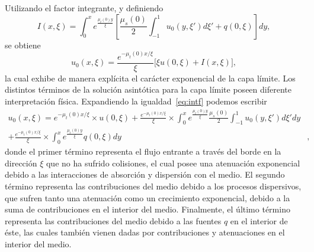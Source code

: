 Utilizando el factor integrante, y definiendo
\begin{equation*}
I(x,\xi) = \int_0^{x} e^{\frac{ \mu_t(0) y}{\xi}}\left[\frac{\mu_s(0)}{2} \int_{-1}^1u_0(y,\xi')d\xi'+q(0,\xi)\right]dy,
\end{equation*}
se obtiene
\begin{equation}
 u_0(x,\xi) = \frac{e^{-\mu_t(0)x/\xi}}{\xi} \Big[\xi u(0,\xi)+I(x,\xi)\Big] ,
 \label{eq:intf}
\end{equation}
la cual exhibe de manera explícita el carácter exponencial 
de la capa límite. Los distintos términos de la solución asintótica 
para la capa límite poseen diferente interpretación física. Expandiendo 
la igualdad~\eqref{eq:intf} podemos escribir
\begin{equation}
\begin{aligned}
 u_0(x,\xi) =   e^{-\mu_t(0)x/\xi}\times u(0,\xi) + \frac{e^{-\mu_t(0)x/\xi}}{\xi} \times  \int_0^{x} e^{\frac{ \mu_t(0) y}{\xi}} \frac{\mu_s(0)}{2} \int_{-1}^1u_0(y,\xi')d\xi'dy&\\
 + \frac{e^{-\mu_t(0)x/\xi}}{\xi} \times \int_0^{x} e^{\frac{ \mu_t(0) y}{\xi}}  q(0,\xi) dy&,
 \label{eq:intfexpandida}
\end{aligned}
\end{equation}
donde el primer término representa el flujo entrante a través del borde en la dirección $\xi$ 
que no ha sufrido colisiones, el cual posee una atenuación exponencial 
debido a las interacciones de absorción y dispersión con el medio. El segundo término representa las contribuciones 
del medio debido a los procesos dispersivos, que sufren tanto una atenuación 
como un crecimiento exponencial, debido a la suma de contribuciones en el interior del medio. Finalmente, el último término representa 
las contribuciones del medio debido a las fuentes $q$ en el interior de éste, 
las cuales también vienen dadas por contribuciones y atenuaciones en el interior del medio.

